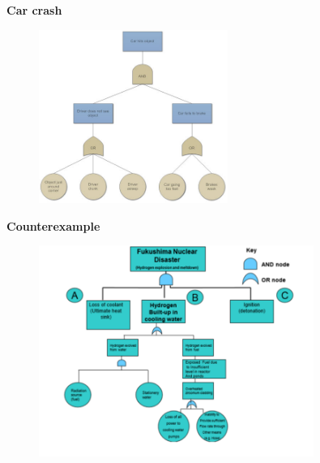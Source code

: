 \documentclass[aspectratio=1610,pdftex,dvipsnames,compress,xcolor={dvipsnames}]{beamer}
\begin{document}
\begin{frame}[plain]{}
    \centering\LARGE\textbf{Car crash}
\end{frame}


\addtocounter{framenumber}{-1}
\begin{frame}{}
    \begin{figure}
        \centering
        \includegraphics[width=0.55\textwidth]{fault.tree_car.jpg}
    \end{figure}
\end{frame}


\begin{frame}[plain]{}
    \centering\LARGE\textbf{Counterexample}
\end{frame}


\addtocounter{framenumber}{-1}
\begin{frame}{}
    \begin{figure}
        \centering
        \includegraphics[width=0.80\textwidth]{fault.tree_fukushima.jpg}
    \end{figure}
\end{frame}
\end{document}
